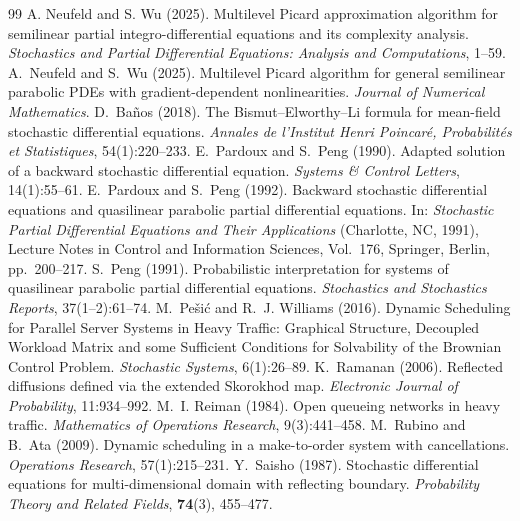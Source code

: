 \documentclass[11pt]{article}
\theoremstyle{definition}
\theoremstyle{plain}
\begin{document}
\begin{singlespace}
\begin{thebibliography}{99}
   A. Neufeld and S. Wu (2025). \newblock Multilevel Picard approximation algorithm for semilinear partial integro-differential equations and its complexity analysis. \newblock \emph{Stochastics and Partial Differential Equations: Analysis and Computations}, 1--59.
   A.~Neufeld and S.~Wu (2025). \newblock Multilevel Picard algorithm for general semilinear parabolic PDEs with gradient-dependent nonlinearities. \newblock \emph{Journal of Numerical Mathematics}. 
     D.~Ba\~nos (2018). \newblock The Bismut--Elworthy--Li formula for mean-field stochastic differential equations. \newblock \emph{Annales de l'Institut Henri Poincar\'e, Probabilit\'es et Statistiques}, 54(1):220--233.
   E.~Pardoux and S.~Peng (1990). \newblock Adapted solution of a backward stochastic differential equation. \newblock \emph{Systems \& Control Letters}, 14(1):55--61.
   E.~Pardoux and S.~Peng (1992). \newblock Backward stochastic differential equations and quasilinear parabolic partial differential equations. \newblock In: \emph{Stochastic Partial Differential Equations and Their Applications} (Charlotte, NC, 1991), Lecture Notes in Control and Information Sciences, Vol.~176, Springer, Berlin, pp.~200--217.
   S.~Peng (1991). \newblock Probabilistic interpretation for systems of quasilinear parabolic partial differential equations. \newblock \emph{Stochastics and Stochastics Reports}, 37(1--2):61--74.
   M.~Pe\v{s}i\'c and R.~J. Williams (2016). \newblock Dynamic Scheduling for Parallel Server Systems in Heavy Traffic: Graphical Structure, Decoupled Workload Matrix and some Sufficient Conditions for Solvability of the Brownian Control Problem. \newblock \emph{Stochastic Systems}, 6(1):26--89. %
   K.~Ramanan (2006). \newblock Reflected diffusions defined via the extended Skorokhod map. \newblock \emph{Electronic Journal of Probability}, 11:934--992.
   M.~I. Reiman (1984). \newblock Open queueing networks in heavy traffic. \newblock \emph{Mathematics of Operations Research}, 9(3):441--458.
   M.~Rubino and B.~Ata (2009). \newblock Dynamic scheduling in a make-to-order system with cancellations. \newblock \emph{Operations Research}, 57(1):215--231.
Y.~Saisho (1987).
Stochastic differential equations for multi-dimensional domain with reflecting boundary.
\emph{Probability Theory and Related Fields}, \textbf{74}(3), 455--477.


\end{thebibliography}
\end{singlespace}
\end{document}
